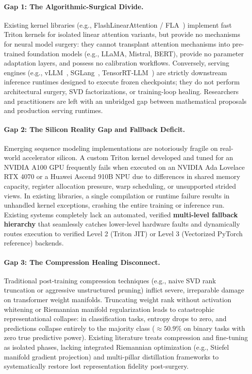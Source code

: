 \paragraph{Gap 1: The Algorithmic-Surgical Divide.}
Existing kernel libraries (e.g., FlashLinearAttention / FLA~\cite{yang2024fla}) implement fast Triton kernels for isolated linear attention variants, but provide no mechanisms for neural model surgery: they cannot transplant attention mechanisms into pre-trained foundation models (e.g., LLaMA, Mistral, BERT), provide no parameter adaptation layers, and possess no calibration workflows. Conversely, serving engines (e.g., vLLM~\cite{kwon2023vllm}, SGLang~\cite{zheng2024sglang}, TensorRT-LLM~\cite{nvidia2023tensorrtllm}) are strictly downstream inference runtimes designed to execute frozen checkpoints; they do not perform architectural surgery, SVD factorizations, or training-loop healing. Researchers and practitioners are left with an unbridged gap between mathematical proposals and production serving runtimes.

\paragraph{Gap 2: The Silicon Reality Gap and Fallback Deficit.}
Emerging sequence modeling implementations are notoriously fragile on real-world accelerator silicon. A custom Triton kernel developed and tuned for an NVIDIA A100 GPU frequently fails when executed on an NVIDIA Ada Lovelace RTX 4070 or a Huawei Ascend 910B NPU due to differences in shared memory capacity, register allocation pressure, warp scheduling, or unsupported strided views. In existing libraries, a single compilation or runtime failure results in unhandled kernel exceptions, crashing the entire training or inference run. Existing systems completely lack an automated, verified \textbf{multi-level fallback hierarchy} that seamlessly catches lower-level hardware faults and dynamically routes execution to verified Level 2 (Triton JIT) or Level 3 (Vectorized PyTorch reference) backends.

\paragraph{Gap 3: The Compression Healing Disconnect.}
Traditional post-training compression techniques (e.g., naive SVD rank truncation or aggressive unstructured pruning) inflict severe, irreparable damage on transformer weight manifolds. Truncating weight rank without activation whitening or Riemannian manifold regularization leads to catastrophic representational collapse: in classification tasks, entropy drops to zero, and predictions collapse entirely to the majority class ($\approx 50.9\%$ on binary tasks with zero true predictive power). Existing literature treats compression and fine-tuning as isolated phases, lacking integrated Riemannian optimization (e.g., Stiefel manifold gradient projection) and multi-pillar distillation frameworks to systematically restore lost representation fidelity post-surgery.

